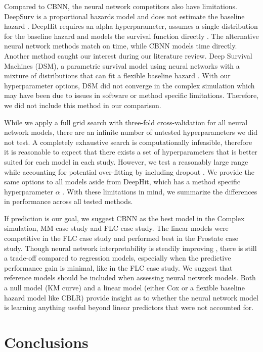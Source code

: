 \documentclass[preprint,12pt,authoryear]{elsarticle}
\begin{document}
Compared to CBNN, the neural network competitors also have limitations. DeepSurv is a proportional hazards model and does not estimate the baseline
hazard \citep{katzman2018DeepSurv}. DeepHit requires an alpha hyperparameter, assumes a single distribution for the baseline hazard and models the
survival function directly \citep{lee2018DeepHit}. The alternative neural network methods match on time, while CBNN models time directly. Another method
caught our interest during our literature review. Deep Survival Machines (DSM), a parametric survival model using neural networks with a mixture of
distributions that can fit a flexible baseline hazard \citep{dsmPaper}. With our hyperparameter options, DSM did not converge in the complex
simulation which may have been due to issues in software or method specific limitations. Therefore, we did not include this method in our comparison.

While we apply a full grid search with three-fold cross-validation for all neural network models, there are an infinite number of untested hyperparameters we did not test. A completely
exhaustive search is computationally infeasible, therefore it is reasonable to expect that there exists a set of hyperparameters that is better suited for each model
in each study. However, we test a reasonably large range while accounting for potential over-fitting by including dropout \citep{gulli2017}. We provide the same
options to all models aside from DeepHit, which has a method specific hyperparameter $\alpha$ \citep{lee2018DeepHit}. With these limitations in mind, we
summarize the differences in performance across all tested methods.

If prediction is our goal, we suggest CBNN as the best model in the Complex simulation, MM case study and FLC case study. The linear models were
competitive in the FLC case study and performed best in the Prostate case study. Though neural network interpretability is steadily improving \citep{interpret},
there is still a trade-off compared to regression models, especially when the predictive performance gain is minimal, like in the FLC case study. We suggest
that reference models should be included when assessing neural network models. Both a null model (KM curve) and a linear model (either Cox or a flexible
baseline hazard model like CBLR) provide insight as to whether the neural network model is learning anything useful beyond linear predictors that were
not accounted for.

\section{Conclusions}\label{sec5}
\end{document}
